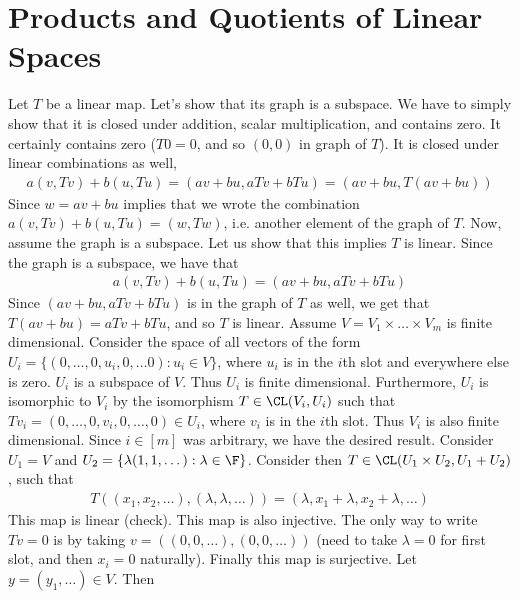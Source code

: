 \documentclass{book}
\begin{document}
\section{Products and Quotients of Linear Spaces}
  \begin{enumerate}[label=\arabic*)]
    \ii 
      Let $T$ be a linear map. Let's show that its graph is a subspace. We have to simply show that it is closed under addition, scalar multiplication, and contains zero. It certainly
      contains zero ($T0 = 0$, and so $(0, 0)$ in graph of $T$). It is closed under linear combinations as well,
      \begin{align*}
        a(v, Tv) + b(u, Tu) = (av + bu, aTv + bTu) = (av + bu, T(av + bu))
      \end{align*}
      Since $w = av + bu$ implies that we wrote the combination $a(v, Tv) + b(u, Tu) = (w, Tw)$, i.e. another element of the graph of $T$. Now, assume the graph is a subspace. Let us show
      that this implies $T$ is linear. Since the graph is a subspace, we have that
      \begin{align*}
        a(v, Tv) + b(u, Tu) = (av + bu, aTv + bTu) 
      \end{align*}
      Since $(av + bu, aTv + bTu)$ is in the graph of $T$ as well, we get that $T(av + bu) = aTv + bTu$, and so $T$ is linear.
    \ii
      Assume $V = V_1 \times \dots \times V_m$ is finite dimensional. Consider the space of all vectors of the form $U_i = \{(0, \dots, 0, u_i, 0, \dots 0): u_i \in V\}$, where $u_i$ is in
      the $i$th slot and everywhere else is zero. $U_i$ is a subspace of $V$. Thus $U_i$ is finite dimensional. Furthermore, $U_i$ is isomorphic to $V_i$ by the isomorphism $T \in \CL(V_i,
      U_i)$ such that $Tv_i = (0, \dots, 0, v_i, 0, \dots, 0) \in U_i$, where $v_i$ is in the $i$th slot. Thus $V_i$ is also finite dimensional. Since $i \in [m]$ was arbitrary, we have the
      desired result.
    \ii
      Consider $U_1 = V$ and $U_2 = \{\lambda(1, 1, \dots): \lambda \in \F\}$. Consider then $T \in \CL(U_1\times U_2, U_1 + U_2)$, such that
      \begin{align*}
        T\left( (x_1, x_2, \dots), (\lambda, \lambda, \dots) \right) = (\lambda, x_1 + \lambda, x_2 + \lambda, \dots)
      \end{align*}
      This map is linear (check). This map is also injective. The only way to write $Tv = 0$ is by taking $v = \left( (0, 0, \dots), (0, 0, \dots)\right)$ (need to take $\lambda = 0$ for
      first slot, and then $x_i = 0$ naturally). Finally this map is surjective. Let $y = (y_1, \dots) \in V$. Then 

\end{enumerate}
\end{document}
